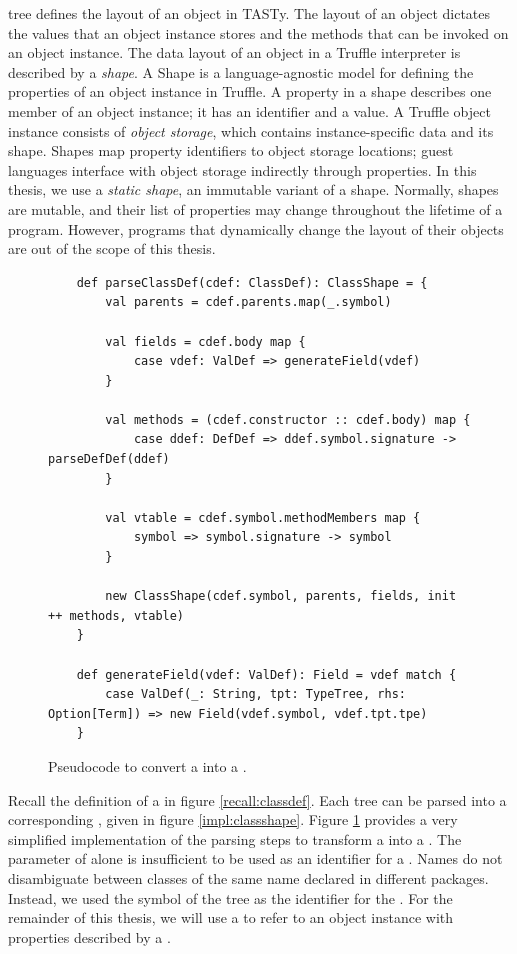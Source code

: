  tree defines the layout of an object in TASTy.
The layout of an object dictates the values that an object instance stores and the methods that can be invoked on an object instance.
The data layout of an object in a Truffle interpreter is described by a \textit{shape}\cite{self:prototypes,truffle:object-model}.
A Shape is a language-agnostic model for defining the properties of an object instance in Truffle.
A property in a shape describes one member of an object instance; it has an identifier and a value.
A Truffle object instance consists of \textit{object storage}, which contains instance-specific data and its shape.
Shapes map property identifiers to object storage locations; guest languages interface with object storage indirectly through properties.
In this thesis, we use a \textit{static shape}, an immutable variant of a shape.
Normally, shapes are mutable, and their list of properties may change throughout the lifetime of a program\cite{truffleruby:object-model}.
However, programs that dynamically change the layout of their objects\cite{java:reflection} are out of the scope of this thesis.

\begin{figure}[!htb]
	\begin{verbatim}
	def parseClassDef(cdef: ClassDef): ClassShape = {
		val parents = cdef.parents.map(_.symbol)
		
		val fields = cdef.body map {
			case vdef: ValDef => generateField(vdef)	
		}
		
		val methods = (cdef.constructor :: cdef.body) map {
			case ddef: DefDef => ddef.symbol.signature -> parseDefDef(ddef)
		}
		
		val vtable = cdef.symbol.methodMembers map {
			symbol => symbol.signature -> symbol
		}
	
		new ClassShape(cdef.symbol, parents, fields, init ++ methods, vtable)
	}

	def generateField(vdef: ValDef): Field = vdef match {
		case ValDef(_: String, tpt: TypeTree, rhs: Option[Term]) => new Field(vdef.symbol, vdef.tpt.tpe)
	}
	\end{verbatim}
	\caption{Pseudocode to convert a  into a .}
	\label{impl:parse-classdef}
\end{figure}

Recall the definition of a  in figure \ref{recall:classdef}.
Each  tree can be parsed into a corresponding , given in figure \ref{impl:classshape}.
Figure \ref{impl:parse-classdef} provides a very simplified implementation of the parsing steps to transform a  into a .
The  parameter of  alone is insufficient to be used as an identifier for a .
Names do not disambiguate between classes of the same name declared in different packages.
Instead, we used the symbol of the  tree as the identifier for the .
For the remainder of this thesis, we will use a  to refer to an object instance with properties described by a .

